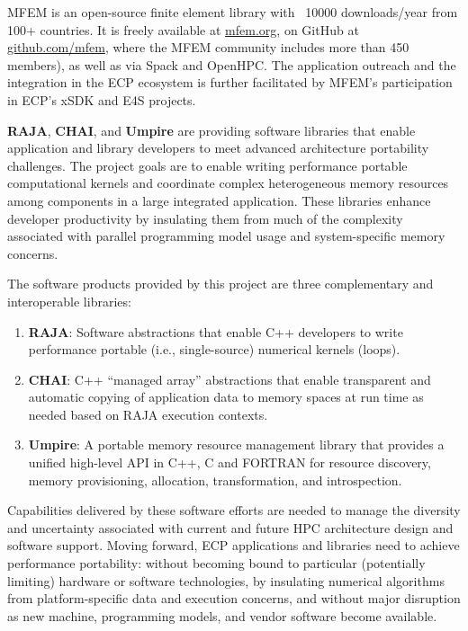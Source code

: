 MFEM is an open-source finite element library with ~10000 downloads/year from 100+
countries. It is freely available at \url{mfem.org}, on GitHub
at \url{github.com/mfem}, where the MFEM community includes more than 450
members), as well as via Spack and OpenHPC. The application outreach and the
integration in the ECP ecosystem is further facilitated by MFEM's participation
in ECP's xSDK and E4S projects.

\textbf{RAJA}, \textbf{CHAI}, and \textbf{Umpire} are providing software libraries that enable
application and library developers to meet advanced architecture
portability challenges. The project goals are to enable writing
performance portable computational kernels and coordinate complex
heterogeneous memory resources among components in a large integrated
application. These libraries enhance developer productivity by insulating
them from much of the complexity associated with parallel programming
model usage and system-specific memory concerns.

The software products provided by this project are three complementary
and interoperable libraries:

\begin{enumerate}

\item {\bf RAJA}: Software abstractions that enable C++ developers to write
    performance portable (i.e., single-source) numerical kernels (loops).

\item {\bf CHAI}: C++ ``managed array'' abstractions that enable transparent
    and automatic copying of application data to memory spaces at run
    time as needed based on RAJA execution contexts.

\item {\bf Umpire}: A portable memory resource management library that provides
    a unified high-level API in C++, C and FORTRAN for resource
    discovery, memory provisioning, allocation, transformation, and
    introspection.

\end{enumerate}

Capabilities delivered by these software efforts are needed to manage the
diversity and uncertainty associated with current and future HPC
architecture design and software support. Moving forward, ECP
applications and libraries need to achieve performance portability:
without becoming bound to particular (potentially limiting) hardware or
software technologies, by insulating numerical algorithms from
platform-specific data and execution concerns, and without major
disruption as new machine, programming models, and vendor software become
available.

